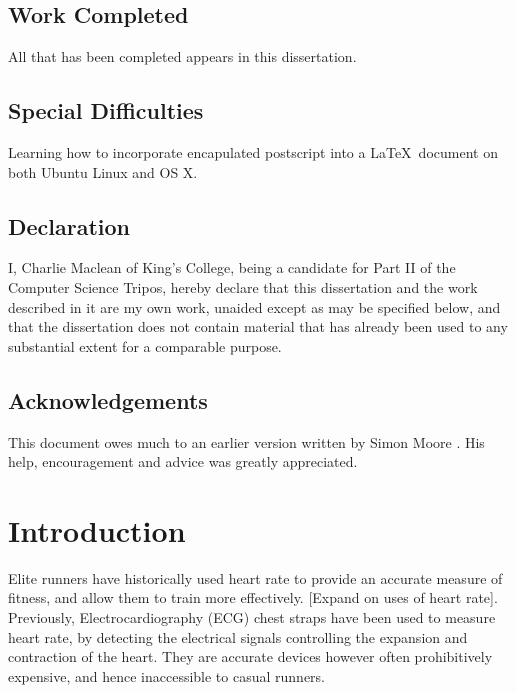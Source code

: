 \documentclass[12pt,a4paper,twoside,openright]{report}
\begin{document}
\section*{Work Completed}

All that has been completed appears in this dissertation.

\section*{Special Difficulties}

Learning how to incorporate encapulated postscript into a \LaTeX\
document on both Ubuntu Linux and OS X.
 
\newpage
\section*{Declaration}

I, Charlie Maclean of King's College, being a candidate for Part II of the 
Computer Science Tripos, hereby declare that this dissertation and the work 
described in it are my own work, unaided except as may be specified below, 
and that the dissertation does not contain material that has already been 
used to any substantial extent for a comparable purpose.

\bigskip
{}

\medskip
{}

\tableofcontents

\listoffigures

\newpage
\section*{Acknowledgements}

This document owes much to an earlier version written by Simon Moore
\cite{Moore95}.  His help, encouragement and advice was greatly 
appreciated.


\pagestyle{headings}

\chapter{Introduction}

Elite runners have historically used heart rate to provide an accurate 
measure of fitness, and allow them to train more effectively. [Expand on uses
of heart rate]. Previously, Electrocardiography (ECG) chest straps have been 
used to measure heart rate, by detecting the electrical signals controlling 
the expansion and contraction of the heart. They are accurate devices however
often prohibitively expensive, and hence inaccessible to casual runners.
\end{document}
